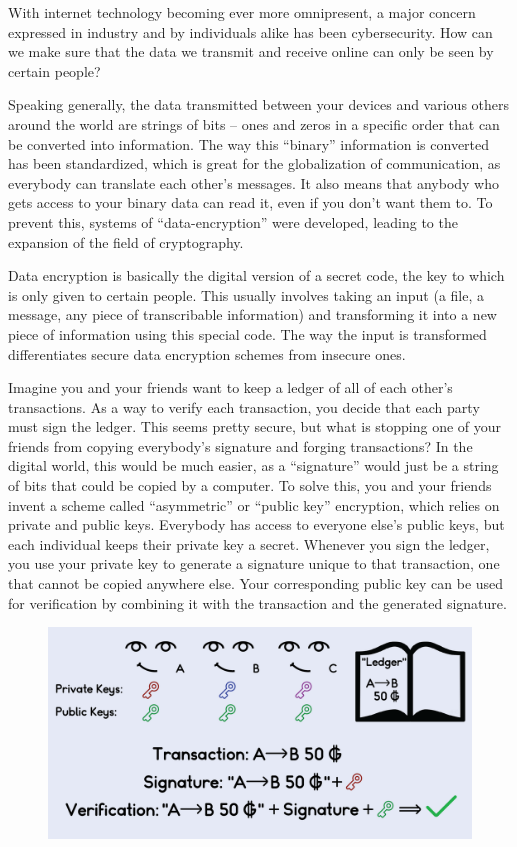 With internet technology becoming ever more omnipresent, a major concern expressed in industry and by individuals alike has been cybersecurity. How can we make sure that the data we transmit and receive online can only be seen by certain people?

Speaking generally, the data transmitted between your devices and various others around the world are strings of bits – ones and zeros in a specific order that can be converted into information. The way this “binary” information is converted has been standardized, which is great for the globalization of communication, as everybody can translate each other’s messages. It also means that anybody who gets access to your binary data can read it, even if you don’t want them to. To prevent this, systems of “data-encryption” were developed, leading to the expansion of the field of cryptography.

Data encryption is basically the digital version of a secret code, the key to which is only given to certain people. This usually involves taking an input (a file, a message, any piece of transcribable information) and transforming it into a new piece of information using this special code. The way the input is transformed differentiates secure data encryption schemes from insecure ones.

Imagine you and your friends want to keep a ledger of all of each other’s transactions. As a way to verify each transaction, you decide that each party must sign the ledger. This seems pretty secure, but what is stopping one of your friends from copying everybody’s signature and forging transactions? In the digital world, this would be much easier, as a “signature” would just be a string of bits that could be copied by a computer. To solve this, you and your friends invent a scheme called “asymmetric” or “public key” encryption, which relies on  private and public keys. Everybody has access to everyone else’s public keys, but each individual keeps their private key a secret. Whenever you sign the ledger, you use your private key to generate a signature unique to that transaction, one that cannot be copied anywhere else. Your corresponding public key can be used for verification by combining it with the transaction and the generated signature. 


\begin{figure}[H]
    \centering \includegraphics*[scale=.25]{assets/cryptography.png}
\end{figure}


